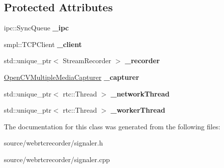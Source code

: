 \subsection*{Protected Attributes}
\begin{DoxyCompactItemize}
\item 
\mbox{\label{classscy_1_1_signaler_a03730ff5e346d3926addd9df70d28576}} 
ipc\+::\+Sync\+Queue {\bfseries \+\_\+ipc}
\item 
\mbox{\label{classscy_1_1_signaler_ac981baacf6a8aa40c74f2461b2b2b581}} 
smpl\+::\+T\+C\+P\+Client {\bfseries \+\_\+client}
\item 
\mbox{\label{classscy_1_1_signaler_a9f0c5181311fdde9ee75544123f4a490}} 
std\+::unique\+\_\+ptr$<$ Stream\+Recorder $>$ {\bfseries \+\_\+recorder}
\item 
\mbox{\label{classscy_1_1_signaler_a48f3a82b5327db207d53c707164ad3ce}} 
\hyperlink{class_open_c_v_multiple_media_capturer}{Open\+C\+V\+Multiple\+Media\+Capturer} {\bfseries \+\_\+capturer}
\item 
\mbox{\label{classscy_1_1_signaler_a6f90c92f0003c9e485f372e86b23e07e}} 
std\+::unique\+\_\+ptr$<$ rtc\+::\+Thread $>$ {\bfseries \+\_\+network\+Thread}
\item 
\mbox{\label{classscy_1_1_signaler_a5eb660dbffafb86591e58458f34fe76d}} 
std\+::unique\+\_\+ptr$<$ rtc\+::\+Thread $>$ {\bfseries \+\_\+worker\+Thread}
\end{DoxyCompactItemize}


The documentation for this class was generated from the following files\+:\begin{DoxyCompactItemize}
\item 
source/webrtcrecorder/signaler.\+h\item 
source/webrtcrecorder/signaler.\+cpp\end{DoxyCompactItemize}
